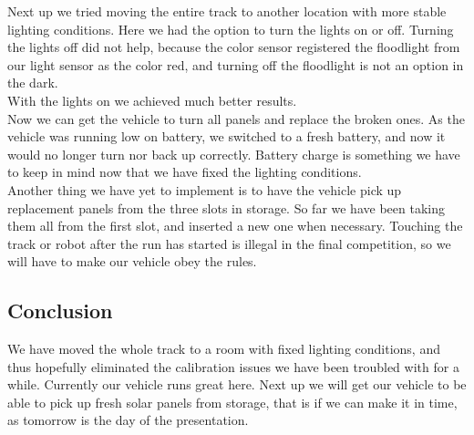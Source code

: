 Next up we tried moving the entire track to another location with more
stable lighting conditions. Here we had the option to turn the lights on
or off. Turning the lights off did not help, because the color sensor
registered the floodlight from our light sensor as the color red, and
turning off the floodlight is not an option in the dark.\\With the lights
on we achieved much better results.\\Now we can get the vehicle to turn
all panels and replace the broken ones. As the vehicle was running low
on battery, we switched to a fresh battery, and now it would no longer
turn nor back up correctly. Battery charge is something we have to keep
in mind now that we have fixed the lighting conditions.\\Another thing
we have yet to implement is to have the vehicle pick up replacement panels
from the three slots in storage. So far we have been taking them all from
the first slot, and inserted a new one when necessary. Touching the track or robot after the run has started is illegal
in the final competition, so we will have to make our vehicle obey the
rules.

\subsection{Conclusion}

We have moved the whole track to a room with fixed lighting conditions,
and thus hopefully eliminated the calibration issues we have been
troubled with for a while. Currently our vehicle runs great here. Next
up we will get our vehicle to be able to pick up fresh solar panels from
storage, that is if we can make it in time, as tomorrow is the day of
the presentation.
